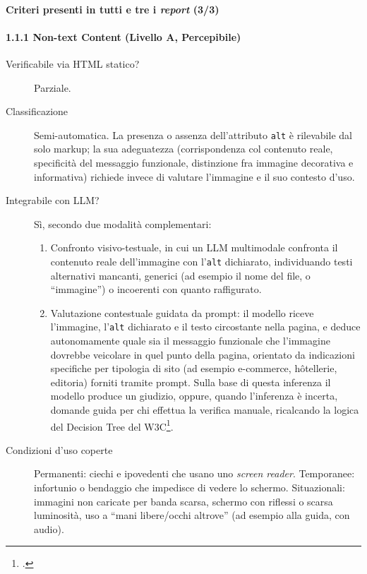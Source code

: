 \paragraph{Criteri presenti in tutti e tre i \emph{report} (3/3)}

\paragraph*{1.1.1 Non-text Content (Livello A, Percepibile)}

\begin{description}

\item[Verificabile via HTML statico?] Parziale.

\item[Classificazione] Semi-automatica. La presenza o assenza dell'attributo \texttt{alt} è rilevabile dal solo markup; la sua adeguatezza (corrispondenza col contenuto reale, specificità del messaggio funzionale, distinzione fra immagine decorativa e informativa) richiede invece di valutare l'immagine e il suo contesto d'uso.

\item[Integrabile con LLM?] Sì, secondo due modalità complementari:

    \begin{enumerate}

        \item Confronto visivo-testuale, in cui un LLM multimodale confronta il contenuto reale dell'immagine con l'\texttt{alt} dichiarato, individuando testi alternativi mancanti, generici (ad esempio il nome del file, o \enquote{immagine}) o incoerenti con quanto raffigurato. 

        \item Valutazione contestuale guidata da prompt: il modello riceve l'immagine, l'\texttt{alt} dichiarato e il testo circostante nella pagina, e deduce autonomamente quale sia il messaggio funzionale che l'immagine dovrebbe veicolare in quel punto della pagina, orientato da indicazioni specifiche per tipologia di sito (ad esempio e-commerce, hôtellerie, editoria) forniti tramite prompt. Sulla base di questa inferenza il modello produce un giudizio, oppure, quando l'inferenza è incerta, domande guida per chi effettua la verifica manuale, ricalcando la logica del Decision Tree del W3C\footcite{w3c:decisional-tree}.

    \end{enumerate}

\item[Condizioni d'uso coperte] Permanenti: ciechi e ipovedenti che usano uno \emph{screen reader}. Temporanee: infortunio o bendaggio che impedisce di vedere lo schermo. Situazionali: immagini non caricate per banda scarsa, schermo con riflessi o scarsa luminosità, uso a \enquote{mani libere/occhi altrove} (ad esempio alla guida, con audio).

\end{description}

